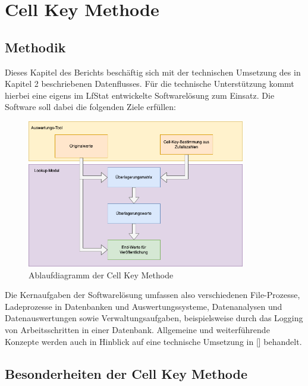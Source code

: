 \section{Cell Key Methode}

\subsection{Methodik}%

Dieses Kapitel des Berichts beschäftig sich mit der technischen Umsetzung des in Kapitel 2 beschriebenen Datenflusses. Für die technische Unterstützung kommt hierbei eine eigens im LfStat entwickelte Softwarelösung zum Einsatz. Die Software soll dabei die folgenden Ziele erfüllen: 

\begin{figure}[H]
    \begin{center}
        \includegraphics[width=0.85\textwidth]{img/ckm_flow.png}
        \caption{Ablaufdiagramm der Cell Key Methode}
    \end{center}
\end{figure}

Die Kernaufgaben der Softwarelösung umfassen also verschiedenen File-Prozesse, Ladeprozesse in Datenbanken und Auswertungssysteme, Datenanalysen und Datenauswertungen sowie Verwaltungsaufgaben, beispielsweise durch das Logging von Arbeitsschritten in einer Datenbank. Allgemeine und weiterführende Konzepte werden auch in Hinblick auf eine technische Umsetzung in [\cite{cri20}] behandelt. 

\subsection{Besonderheiten der Cell Key Methode}%



